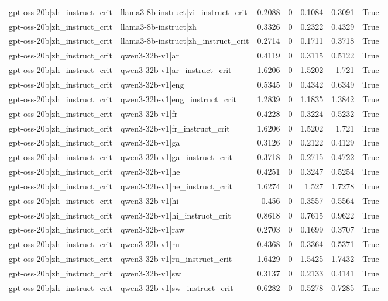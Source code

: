 \begin{table}
\begin{tabular}{l l r r r r l}
gpt-oss-20b|zh_instruct_crit & llama3-8b-instruct|vi_instruct_crit & 0.2088 & 0 & 0.1084 & 0.3091 & True \\
gpt-oss-20b|zh_instruct_crit & llama3-8b-instruct|zh & 0.3326 & 0 & 0.2322 & 0.4329 & True \\
gpt-oss-20b|zh_instruct_crit & llama3-8b-instruct|zh_instruct_crit & 0.2714 & 0 & 0.1711 & 0.3718 & True \\
gpt-oss-20b|zh_instruct_crit & qwen3-32b-v1|ar & 0.4119 & 0 & 0.3115 & 0.5122 & True \\
gpt-oss-20b|zh_instruct_crit & qwen3-32b-v1|ar_instruct_crit & 1.6206 & 0 & 1.5202 & 1.721 & True \\
gpt-oss-20b|zh_instruct_crit & qwen3-32b-v1|eng & 0.5345 & 0 & 0.4342 & 0.6349 & True \\
gpt-oss-20b|zh_instruct_crit & qwen3-32b-v1|eng_instruct_crit & 1.2839 & 0 & 1.1835 & 1.3842 & True \\
gpt-oss-20b|zh_instruct_crit & qwen3-32b-v1|fr & 0.4228 & 0 & 0.3224 & 0.5232 & True \\
gpt-oss-20b|zh_instruct_crit & qwen3-32b-v1|fr_instruct_crit & 1.6206 & 0 & 1.5202 & 1.721 & True \\
gpt-oss-20b|zh_instruct_crit & qwen3-32b-v1|ga & 0.3126 & 0 & 0.2122 & 0.4129 & True \\
gpt-oss-20b|zh_instruct_crit & qwen3-32b-v1|ga_instruct_crit & 0.3718 & 0 & 0.2715 & 0.4722 & True \\
gpt-oss-20b|zh_instruct_crit & qwen3-32b-v1|he & 0.4251 & 0 & 0.3247 & 0.5254 & True \\
gpt-oss-20b|zh_instruct_crit & qwen3-32b-v1|he_instruct_crit & 1.6274 & 0 & 1.527 & 1.7278 & True \\
gpt-oss-20b|zh_instruct_crit & qwen3-32b-v1|hi & 0.456 & 0 & 0.3557 & 0.5564 & True \\
gpt-oss-20b|zh_instruct_crit & qwen3-32b-v1|hi_instruct_crit & 0.8618 & 0 & 0.7615 & 0.9622 & True \\
gpt-oss-20b|zh_instruct_crit & qwen3-32b-v1|raw & 0.2703 & 0 & 0.1699 & 0.3707 & True \\
gpt-oss-20b|zh_instruct_crit & qwen3-32b-v1|ru & 0.4368 & 0 & 0.3364 & 0.5371 & True \\
gpt-oss-20b|zh_instruct_crit & qwen3-32b-v1|ru_instruct_crit & 1.6429 & 0 & 1.5425 & 1.7432 & True \\
gpt-oss-20b|zh_instruct_crit & qwen3-32b-v1|sw & 0.3137 & 0 & 0.2133 & 0.4141 & True \\
gpt-oss-20b|zh_instruct_crit & qwen3-32b-v1|sw_instruct_crit & 0.6282 & 0 & 0.5278 & 0.7285 & True \\

\end{tabular}
\end{table}
